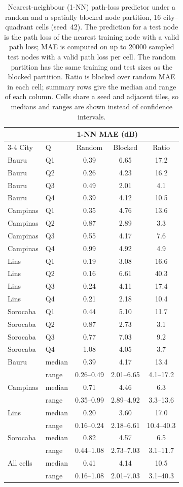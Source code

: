 \begin{table}[t]
\caption{Nearest-neighbour (1-NN) path-loss predictor under a random and a spatially blocked node partition, 16 city--quadrant cells (seed~42). The prediction for a test node is the path loss of the nearest training node with a valid path loss; MAE is computed on up to \num{20000} sampled test nodes with a valid path loss per cell. The random partition has the same training and test sizes as the blocked partition. Ratio is blocked over random MAE in each cell; summary rows give the median and range of each column. Cells share a seed and adjacent tiles, so medians and ranges are shown instead of confidence intervals.}
\label{tab:nn_contrast}
\centering
\small
\begin{tabular}{llccc}
\toprule
 & & \multicolumn{2}{c}{1-NN MAE (dB)} & \\
\cmidrule(lr){3-4}
City & Q & Random & Blocked & Ratio \\
\midrule
Bauru & Q1 & 0.39 & 6.65 & 17.2 \\
Bauru & Q2 & 0.26 & 4.23 & 16.2 \\
Bauru & Q3 & 0.49 & 2.01 & 4.1 \\
Bauru & Q4 & 0.39 & 4.12 & 10.5 \\
Campinas & Q1 & 0.35 & 4.76 & 13.6 \\
Campinas & Q2 & 0.87 & 2.89 & 3.3 \\
Campinas & Q3 & 0.55 & 4.17 & 7.6 \\
Campinas & Q4 & 0.99 & 4.92 & 4.9 \\
Lins & Q1 & 0.19 & 3.08 & 16.6 \\
Lins & Q2 & 0.16 & 6.61 & 40.3 \\
Lins & Q3 & 0.24 & 4.11 & 17.4 \\
Lins & Q4 & 0.21 & 2.18 & 10.4 \\
Sorocaba & Q1 & 0.44 & 5.10 & 11.7 \\
Sorocaba & Q2 & 0.87 & 2.73 & 3.1 \\
Sorocaba & Q3 & 0.77 & 7.03 & 9.2 \\
Sorocaba & Q4 & 1.08 & 4.05 & 3.7 \\
\midrule
Bauru & median & 0.39 & 4.17 & 13.4 \\
 & range & 0.26--0.49 & 2.01--6.65 & 4.1--17.2 \\
Campinas & median & 0.71 & 4.46 & 6.3 \\
 & range & 0.35--0.99 & 2.89--4.92 & 3.3--13.6 \\
Lins & median & 0.20 & 3.60 & 17.0 \\
 & range & 0.16--0.24 & 2.18--6.61 & 10.4--40.3 \\
Sorocaba & median & 0.82 & 4.57 & 6.5 \\
 & range & 0.44--1.08 & 2.73--7.03 & 3.1--11.7 \\
\midrule
All cells & median & 0.41 & 4.14 & 10.5 \\
 & range & 0.16--1.08 & 2.01--7.03 & 3.1--40.3 \\
\bottomrule
\end{tabular}
\end{table}
